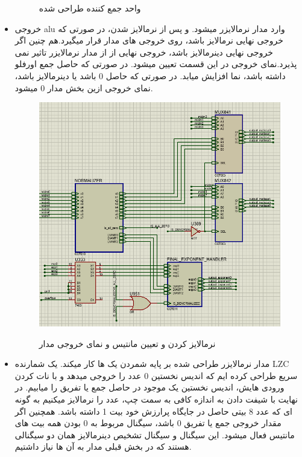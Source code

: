 \documentclass[twoside]{article}
\begin{document}
\begin{itemize}
\begin{figure}[h!]
\begin{center}
				\caption{واحد جمع کننده طراحی شده}				
			\end{center}
		\end{figure} 
		\item
		خروجی alu وارد مدار نرمالایزر میشود. و پس از نرمالایز شدن، در صورتی که خروجی نهایی نرمالایز باشد، روی خروجی های مدار قرار میگیرد.هم چنین اگر خروجی نهایی دینرمالایز باشد، خروجی نهایی از از  مدار نرمالایزر تاثیر نمی پذیرد.نمای خروجی در این قسمت تعیین میشود. در صورتی که حاصل جمع اورفلو داشته باشد، نما افزایش میابد. در صورتی که حاصل 0 باشد یا دینرمالایز باشد، نمای خروجی ازین بخش مدار 0 میشود.
		\begin{figure}[h!]
			\begin{center}
				\includegraphics[scale=0.4]{normalizer}‎
				\caption{نرمالایز کردن و تعیین مانتیس و نمای خروجی مدار}
			\end{center}
		\end{figure} 
	\item
	مدار نرمالایزر طراحی شده بر پایه شمردن یک ها کار میکند. یک شمارنده LZC سریع طراحی کرده ایم که اندیس نخستین 0 عدد را خروجی میدهد و با نات کردن ورودی هایش، اندیس نخستین یک موجود در حاصل جمع یا تفریق را میابیم. در نهایت با شیفت دادن به اندازه کافی به سمت چپ، عدد را نرمالایز میکنیم به گونه ای که عدد 8 بیتی حاصل در جایگاه پرارزش خود بیت 1 داشته باشد. همچنین اگر مقدار خروجی جمع یا تفریق 0 باشد، سیگنال مربوط به 0 بودن همه بیت های مانتیس فعال میشود. این سیگنال و سیگنال تشخیص دینرمالایز همان دو سیگنالی هستند که در بخش قبلی مدار به آن ها نیاز داشتیم.

\end{itemize}
\end{document}
